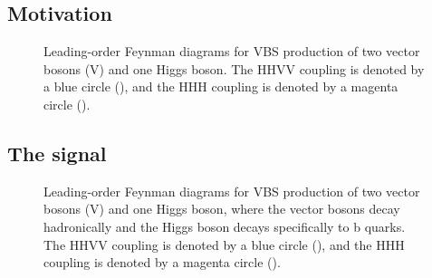 \subsection{Motivation}
\begin{figure}[htb]
    \centering
    \quad
    \quad
    \caption{
        Leading-order Feynman diagrams for VBS production of two vector bosons (V) and one Higgs boson. 
        The HHVV coupling \kVV is denoted by a blue circle (\textcolor{blue}{}), and the HHH coupling \kHHH is denoted by a magenta circle (\textcolor{magenta}{}). 
    }
    \label{fig:vbsvvh_feynman}
\end{figure}
\subsection{The signal}
\begin{figure}[htb]
    \centering
    \quad
    \quad
    \caption{
        Leading-order Feynman diagrams for VBS production of two vector bosons (V) and one Higgs boson, where the vector bosons decay hadronically and the Higgs boson decays specifically to b quarks. 
        The HHVV coupling \kVV is denoted by a blue circle (\textcolor{blue}{}), and the HHH coupling \kHHH is denoted by a magenta circle (\textcolor{magenta}{}). 
    }
    \label{fig:vbsvvh_feynman_allhad}
\end{figure}
